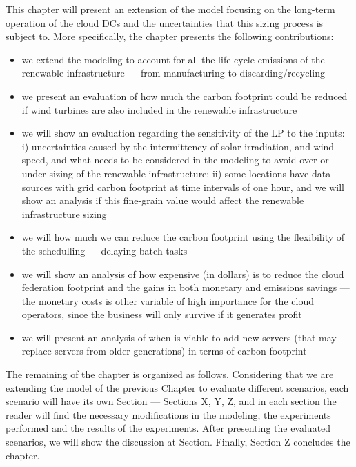 This chapter will present an extension of the model focusing on the long-term operation of the cloud DCs and the uncertainties that this sizing process is subject to. More specifically, the chapter presents the following contributions:

\begin{itemize}
 
\item we extend the modeling to account for all the life cycle emissions of the renewable infrastructure --- from manufacturing to discarding/recycling

\item we present an evaluation of how much the carbon footprint could be reduced if wind turbines are also included in the renewable infrastructure 

\item we will show an evaluation regarding the sensitivity of the LP to the inputs: i) uncertainties caused by the intermittency of solar irradiation, and wind speed, and what needs to be considered in the modeling to avoid over or under-sizing of the renewable infrastructure; ii) some locations have data sources with grid carbon footprint at time intervals of one hour, and we will show an analysis if this fine-grain value would affect the renewable infrastructure sizing
  
\item we will how much we can reduce the carbon footprint using the flexibility of the schedulling --- delaying batch tasks 
 
\item we will show an analysis of how expensive (in dollars) is to reduce the cloud federation footprint and the gains in both monetary and emissions savings --- the monetary costs is other variable of high importance for the cloud operators, since the business will only survive if it generates profit

\item we will present an analysis of when is viable to add new servers (that may replace servers from older generations) in terms of carbon footprint

 
\end{itemize}

The remaining of the chapter is organized as follows. Considering that we are extending the model of the previous Chapter to evaluate different scenarios, each scenario will have its own Section --- Sections X, Y, Z, and in each section the reader will find the necessary modifications in the modeling, the experiments performed and the results of the experiments. After presenting the evaluated scenarios, we will show the discussion at Section. Finally, Section Z concludes the chapter.

